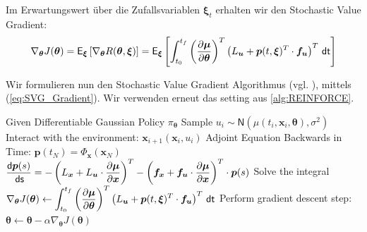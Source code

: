 \documentclass[a4paper, 12pt]{scrartcl}
\newcommand{\dt}{\thinspace \mathsf{dt}}
\newcommand{\ds}{\thinspace \mathsf{ds}}
\begin{document}
Im Erwartungswert über die Zufallsvariablen $\bm{\xi}_t$ erhalten wir den 
Stochastic Value Gradient:
\begin{align}
    \nabla_{\bm{\theta}} J(\bm{\theta}) 
    =
    \mathsf{E}_{\bm{\xi}}
    \left[
        \nabla_{\bm{\theta}}
        R(\bm{\theta}, \bm{\xi})
    \right]
    =
    \mathsf{E}_{\bm{\xi}}
    \left[
        \int_{t_0}^{t_f} 
        \left(
            \frac{\partial \bm{\mu}}{\partial \bm{\theta}}
        \right)^T
        \left(
            L_{\bm{u}}
            +
            \bm{p}(t,\bm{\xi})^T
            \cdot
            \bm{f}_{\bm{u}}
        \right)^T
        \dt
    \right]
    \label{eq:SVG_Gradient}
\end{align}

Wir formulieren nun den Stochastic Value Gradient Algorithmus
(vgl. \cite{HessPathwise}),
mittels (\ref{eq:SVG_Gradient}).
Wir verwenden erneut das setting aus \ref{alg:REINFORCE}.

\begin{algorithm}
    \caption{Stochastic Value Gradient}\label{alg:SVG}
    \begin{algorithmic}[1]
        \State Given Differentiable Gaussian Policy $\pi_{\bm{\theta}}$
                \State Sample $u_i \sim \mathsf{N}(\mu(t_i, \bm{x}_i, \bm{\theta}), \sigma^2)$
                \State Interact with the environment: $\bm{x}_{i+1}(\bm{x}_i, u_i)$
            \EndFor
            \State Adjoint Equation Backwards in Time: $\bm{p}(t_N) = \Phi_{\bm{x}}(\bm{x}_N)$
            \State
            $\begin{aligned}
                \frac{\mathsf{d}\bm{p}(s)}{\ds} 
                =
                -
                \left(
                    L_{\bm{x}} + L_{\bm{u}} \cdot \frac{\partial \bm{\mu}}{\partial \bm{x}}
                \right)^T
                -
                \left(
                    \bm{f}_{\bm{x}} + \bm{f}_{\bm{u}} 
                    \cdot 
                    \frac{\partial \bm{\mu}}{\partial \bm{x}}
                \right)^T
                \cdot 
                \bm{p}(s)
            \end{aligned}$
            \State Solve the integral
            \State
            $\begin{aligned}
                \nabla_{\bm{\theta}} J(\bm{\theta}) 
                \leftarrow
                \int_{t_0}^{t_f} 
                \left(
                    \frac{\partial \bm{\mu}}{\partial \bm{\theta}}
                \right)^T
                \left(
                    L_{\bm{u}}
                    +
                    \bm{p}(t,\bm{\xi})^T
                    \cdot
                    \bm{f}_{\bm{u}}
                \right)^T
                \dt
            \end{aligned}$
            \State Perform gradient descent step: $\bm{\theta} \leftarrow \bm{\theta} - \alpha \nabla_{\bm{\theta}} J(\bm{\theta})$
        \EndFor
    \end{algorithmic}
\end{algorithm}
\end{document}
